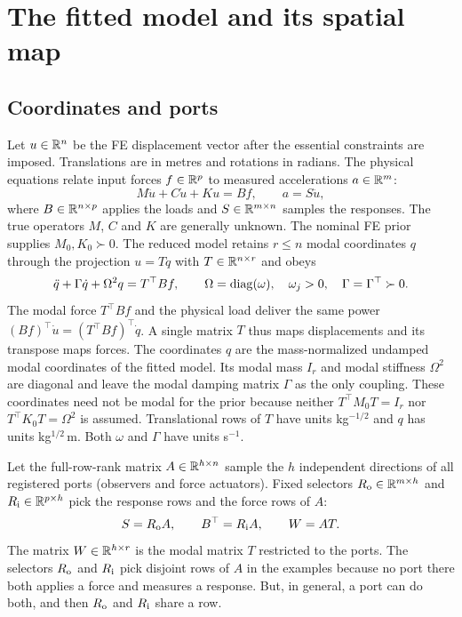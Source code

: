 \section{The fitted model and its spatial map}\label{sec:setting}
\subsection{Coordinates and ports}
Let $u\in\mathbb R^n$ be the FE displacement vector after the essential constraints
are imposed. Translations are in metres and rotations in radians. The
physical equations relate input forces $f\in\mathbb R^p$ to measured accelerations
$a\in\mathbb R^m$:
\begin{equation}
 M\ddot u+C\dot u+Ku=Bf,\qquad a=S\ddot u,
 \label{eq:physical}
\end{equation}
where $B\in\mathbb R^{n\times p}$ applies the loads and $S\in\mathbb R^{m\times n}$ samples
the responses. The true operators $M$, $C$ and $K$ are generally unknown. The
nominal FE prior supplies $M_0,K_0\succ0$. The reduced model retains $r\le n$
modal coordinates $q$ through the projection $u=Tq$ with $T\in\mathbb R^{n\times r}$
and obeys
\begin{equation}
 \ddot q+\Gamma\dot q+\Omega^2q=T^{\top}Bf,\qquad
 \Omega=\operatorname{diag}(\omega),\quad \omega_j>0,\quad\Gamma=\Gamma^{\top}\succ0.
 \label{eq:latent}
\end{equation}
The modal force $T^{\top}Bf$ and the physical load deliver the same power
$(Bf)^{\top}\dot u=(T^{\top}Bf)^{\top}\dot q$. A single matrix $T$ thus maps
displacements and its transpose maps forces. The coordinates $q$ are the
mass-normalized undamped modal coordinates of the fitted model. Its modal
mass $I_r$ and modal stiffness $\Omega^2$ are diagonal and leave the modal
damping matrix $\Gamma$ as the only coupling. These coordinates need not be
modal for the prior because neither $T^{\top}M_0T=I_r$ nor
$T^{\top}K_0T=\Omega^2$ is assumed. Translational rows of $T$ have units
kg$^{-1/2}$ and $q$ has units kg$^{1/2}$\,m. Both $\omega$ and $\Gamma$ have
units s$^{-1}$.

Let the full-row-rank matrix $A\in\mathbb R^{h\times n}$ sample the $h$ independent
directions of all registered ports (observers and force actuators). Fixed
selectors $R_{\rm o}\in\mathbb R^{m\times h}$ and $R_{\rm i}\in\mathbb R^{p\times h}$ pick
the response rows and the force rows of $A$:
\begin{equation}
 S=R_{\rm o}A,\qquad B^{\top}=R_{\rm i}A,\qquad W=AT.
 \label{eq:registration}
\end{equation}
The matrix $W\in\mathbb R^{h\times r}$ is the modal matrix $T$ restricted to the
ports. The selectors $R_{\rm o}$ and $R_{\rm i}$ pick disjoint rows of $A$ in
the examples because no port there both applies a force and measures a
response. But, in general, a port can do both, and then $R_{\rm o}$ and $R_{\rm i}$ share a row.

